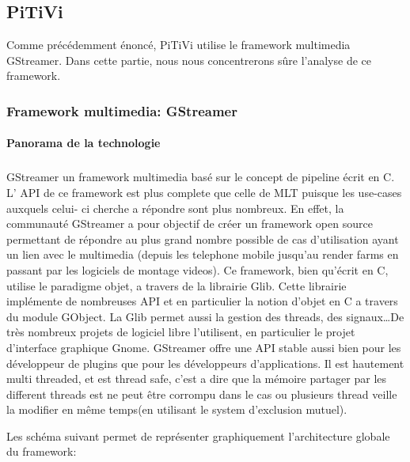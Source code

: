 \subsection {PiTiVi}

Comme précédemment énoncé, PiTiVi utilise le framework multimedia
GStreamer. Dans cette partie, nous nous concentrerons sûre l'analyse
de ce framework.

\subsubsection {Framework multimedia: GStreamer}

\paragraph {Panorama de la technologie} %

\subparagraph{}

GStreamer un framework multimedia basé sur le concept de pipeline
écrit en C.  L' API de ce framework est plus complete que celle de
MLT puisque les use-cases auxquels celui- ci cherche a répondre sont
plus nombreux. En effet, la communauté GStreamer a pour objectif de
créer un framework open source permettant de répondre au plus grand
nombre possible de cas d'utilisation ayant un lien avec le multimedia
(depuis les telephone mobile jusqu'au render farms en passant par les
logiciels de montage videos).  Ce framework, bien qu'écrit en C,
utilise le paradigme objet, a travers de la librairie Glib. Cette
librairie implémente de nombreuses API et en particulier la notion
d'objet en C a travers du module GObject. La Glib permet aussi la
gestion des threads, des signaux\ldots De très nombreux projets
de logiciel libre l'utilisent, en particulier le projet d'interface
graphique Gnome. GStreamer offre une API stable aussi bien pour les
développeur de plugins que pour les développeurs d'applications. Il
est hautement multi threaded, et est thread safe,
c'est a dire que la mémoire partager par les different threads est ne
peut être corrompu dans le cas ou plusieurs thread veille la modifier
en même temps(en utilisant le system d'exclusion mutuel).

Les schéma suivant permet de représenter graphiquement l'architecture
globale du framework:


